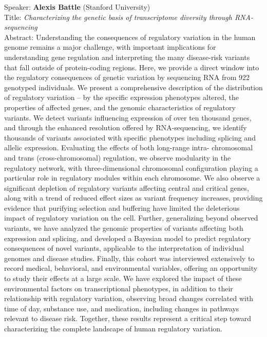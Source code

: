 \documentclass[11pt]{article}
\begin{document}
\bigskip
\noindent
Speaker: {\bf Alexis Battle} (Stanford University)\\
Title: {\it Characterizing the genetic basis of transcriptome diversity through RNA-sequencing}\\
Abstract: Understanding the consequences of regulatory variation in the human
genome remains a major challenge, with important implications for
understanding gene regulation and interpreting the many disease-risk
variants that fall outside of protein-coding regions.  Here, we
provide a direct window into the regulatory consequences of genetic
variation by sequencing RNA from 922 genotyped individuals. We present
a comprehensive description of the distribution of regulatory
variation – by the specific expression phenotypes altered, the
properties of affected genes, and the genomic characteristics of
regulatory variants. We detect variants influencing expression of over
ten thousand genes, and through the enhanced resolution offered by
RNA-sequencing, we identify thousands of variants associated with
specific phenotypes including splicing and allelic
expression. Evaluating the effects of both long-range intra-
chromosomal and trans (cross-chromosomal) regulation, we observe
modularity in the regulatory network, with three-dimensional
chromosomal configuration playing a particular role in regulatory
modules within each chromosome. We also observe a significant
depletion of regulatory variants affecting central and critical genes,
along with a trend of reduced effect sizes as variant frequency
increases, providing evidence that purifying selection and buffering
have limited the deleterious impact of regulatory variation on the
cell. Further, generalizing beyond observed variants, we have analyzed
the genomic properties of variants affecting both expression and
splicing, and developed a Bayesian model to predict regulatory
consequences of novel variants, applicable to the interpretation of
individual genomes and disease studies. Finally, this cohort was
interviewed extensively to record medical, behavioral, and
environmental variables, offering an opportunity to study their
effects at a large scale.  We have explored the impact of these
environmental factors on transcriptional phenotypes, in addition to
their relationship with regulatory variation, observing broad changes
correlated with time of day, substance use, and medication, including
changes in pathways relevant to disease risk. Together, these results
represent a critical step toward characterizing the complete landscape
of human regulatory variation.
\end{document}
